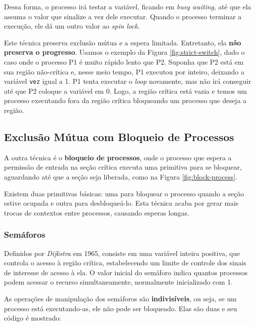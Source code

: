 Dessa forma, o processo irá testar a variável, ficando em \textit{busy waiting}, até que ela assuma o valor que sinalize a vez dele executar. Quando o processo terminar a execução, ele dá um outro valor ao \textit{spin lock}.

Este técnica preserva exclusão mútua e a espera limitada. Entretanto, ela \textbf{não preserva o progresso}. Usamos o exemplo da Figura \ref{fig:strict-switch}, dado o caso onde o processo P1 é muito rápido lento que P2. Suponha que P2 está em sua região não-crítica e, nesse meio tempo, P1 executou por inteiro, deixando a variável \texttt{vez} igual a 1. P1 tenta executar o \textit{loop} novamente, mas não irá conseguir até que P2 coloque a variável em 0. Logo, a região crítica está vazia e temos um processo executando fora da região crítica bloqueando um processo que deseja a região.









\subsection{Exclusão Mútua com Bloqueio de Processos}
A outra técnica é o \textbf{bloqueio de processos}, onde o processo que espera a permissão de entrada na seção crítica executa uma primitiva para se bloquear, aguardando até que a seção seja liberada, como na Figura \ref{fig:block-process}.

Existem duas primitivas básicas: uma para bloquear o processo quando a seção estive ocupada e outra para desbloqueá-lo. Esta técnica acaba por gerar mais trocas de contextos entre processos, causando esperas longas.





\subsubsection{Semáforos}
Definidos por \textit{Dijkstra} em 1965, consiste em uma variável inteira positiva, que controla o acesso à região crítica, estabelecendo um limite de controle dos sinais de interesse de acesso à ela. O valor inicial do semáforo indica quantos processos podem acessar o recurso simultaneamente, normalmente inicializado com 1.

As operações de manipulação dos semáforos são \textbf{indivisíveis}, ou seja, se um processo está executando-as, ele não pode ser bloqueado. Elas são duas e seu código é mostrado:

